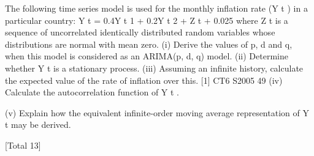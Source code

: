 \documentclass[a4paper,12pt]{article}
\begin{document}
 



The following time series model is used for the monthly inflation rate (Y t ) in a
particular country:
Y t = 0.4Y t
1
+ 0.2Y t
2
+ Z t + 0.025
where {Z t } is a sequence of uncorrelated identically distributed random variables
whose distributions are normal with mean zero.
(i)
Derive the values of p, d and q, when this model is considered as an
ARIMA(p, d, q) model. 
(ii) Determine whether {Y t } is a stationary process. 
(iii) Assuming an infinite history, calculate the expected value of the rate of
inflation over this. [1]
CT6 S2005
49
(iv) Calculate the autocorrelation function of {Y t }.

(v) Explain how the equivalent infinite-order moving average representation of
{Y t } may be derived.

[Total 13]

\end{document}
